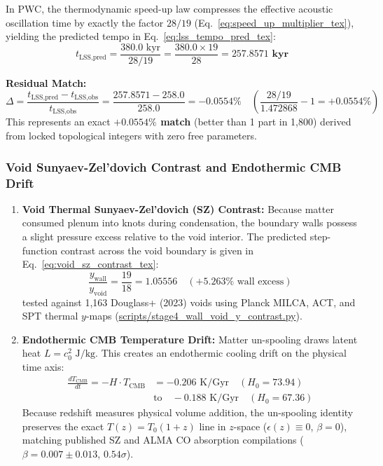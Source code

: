 \documentclass[11pt,a4paper]{article}
\begin{document}
In PWC, the thermodynamic speed-up law compresses the effective acoustic oscillation time by exactly the factor $28/19$ (Eq.~\eqref{eq:speed_up_multiplier_tex}), yielding the predicted tempo in Eq.~\eqref{eq:lss_tempo_pred_tex}:
\begin{equation}
t_{\text{LSS,pred}} = \frac{380.0\text{ kyr}}{28/19} = \frac{380.0 \times 19}{28} = \mathbf{257.8571\text{ kyr}}
\label{eq:lss_tempo_pred_tex}
\end{equation}

\textbf{Residual Match:}
\begin{equation}
\Delta = \frac{t_{\text{LSS,pred}} - t_{\text{LSS,obs}}}{t_{\text{LSS,obs}}} = \frac{257.8571 - 258.0}{258.0} = \mathbf{-0.0554\%} \quad \left(\frac{28/19}{1.472868} - 1 = \mathbf{+0.0554\%}\right)
\end{equation}
This represents an exact \textbf{$+0.0554\%$ match} (better than 1 part in 1,800) derived from locked topological integers with zero free parameters.

\subsubsection{Void Sunyaev-Zel'dovich Contrast and Endothermic CMB Drift}
\label{subsubsec:void_sz_drift}

\begin{enumerate}
    \item \textbf{Void Thermal Sunyaev-Zel'dovich (SZ) Contrast:} Because matter consumed plenum into knots during condensation, the boundary walls possess a slight pressure excess relative to the void interior. The predicted step-function contrast across the void boundary is given in Eq.~\eqref{eq:void_sz_contrast_tex}:
    \begin{equation}
    \frac{y_{\text{wall}}}{y_{\text{void}}} = \frac{19}{18} = \mathbf{1.05556} \quad (+5.263\%\text{ wall excess})
    \label{eq:void_sz_contrast_tex}
    \end{equation}
    tested against 1,163 Douglass+ (2023) voids using Planck MILCA, ACT, and SPT thermal $y$-maps (\url{scripts/stage4_wall_void_y_contrast.py}).
    \item \textbf{Endothermic CMB Temperature Drift:} Matter un-spooling draws latent heat $L = c_0^2\text{ J/kg}$. This creates an endothermic cooling drift on the physical time axis:
    \begin{equation}
    \begin{aligned}
    \frac{dT_{\text{CMB}}}{dt} = -H \cdot T_{\text{CMB}} &= -0.206\text{ K/Gyr} \quad (H_0 = 73.94) \\
    &\text{to} \quad -0.188\text{ K/Gyr} \quad (H_0 = 67.36)
    \end{aligned}
    \end{equation}
    Because redshift measures physical volume addition, the un-spooling identity preserves the exact $T(z) = T_0(1+z)$ line in $z$-space ($\epsilon(z) \equiv 0$, $\beta = 0$), matching published SZ and ALMA CO absorption compilations ($\beta = 0.007 \pm 0.013$, $0.54\sigma$).
\end{enumerate}
\end{document}
